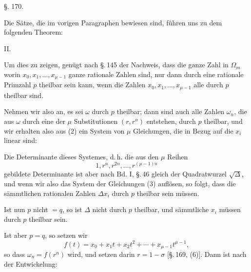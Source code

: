 
\begin{center}
\S. 170.

\end{center}

Die S\"atze, die im vorigen Paragraphen bewiesen sind, f\"uhren uns zu dem folgenden Theorem:

II. 

Um dies zu zeigen, gen\"ugt nach \S.\,145 der Nachweis, dass die ganze Zahl in $\Omega_m$
worin $x_0, x_1, \ldots, x_{\mu-1}$ ganze rationale Zahlen sind, nur dann durch eine rationale Primzahl $p$ theilbar sein kann, wenn die Zahlen $x_0, x_1, \ldots, x_{\mu-1}$ alle durch $p$ theilbar sind.

Nehmen wir also an, es sei $\omega$ durch $p$ theilbar; dann sind auch alle Zahlen $\omega_n$, die aus $\omega$ durch eine der $\mu$ Substitutionen $(r, r^n)$ entstehen, durch $p$ theilbar, und wir erhalten also aus (2) ein System von $\mu$ Gleichungen, die in Bezug auf die $x_i$ linear sind:

Die Determinante dieses Systemes, d.\,h. die aus den $\mu$ Reihen
\[ 1, r^n, r^{2n}, \ldots, r^{(\mu-1)n} \]
gebildete Determinante ist aber nach Bd. I, \S.\,46 gleich der Quadratwurzel $\sqrt{\varDelta}$, und wenn wir also das System der Gleichungen (3) aufl\"osen, so folgt, dass die s\"ammtlichen rationalen Zahlen $\varDelta x_i$ durch $p$ theilbar sein m\"ussen.

Ist nun $p$ nicht $=q$, so ist $\varDelta$ nicht durch $p$ theilbar, und s\"ammtliche $x_i$ m\"ussen durch $p$ theilbar sein.

Ist aber $p = q$, so setzen wir
\[ f(t) = x_0 + x_1 t + x_2 t^2 + \cdots + x_{\mu-1} t^{\mu-1}, \]
so dass $\omega_n = f(r^n)$ wird, und setzen darin $r = 1 - \sigma$ [\S.\,169, (6)]. Dann ist nach der  Entwickelung:
